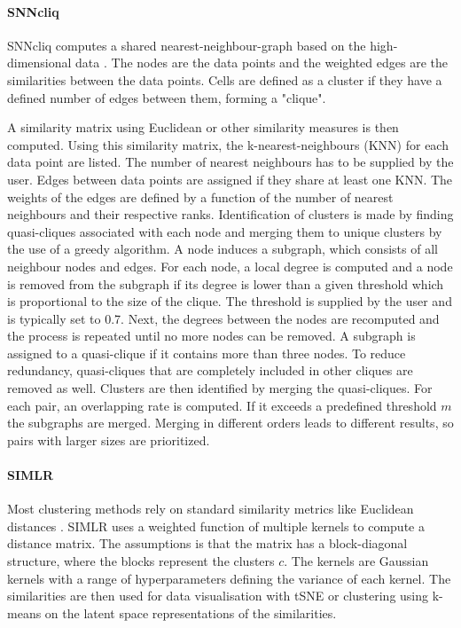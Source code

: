 \documentclass[12pt, a4paper]{article}\usepackage[]{graphicx}\usepackage[]{color}
\begin{document}
\paragraph{SNNcliq}
SNNcliq computes a shared nearest-neighbour-graph based on the high-dimensional data \citep{xu2015identification}. The nodes are the data points and the weighted edges are the similarities between the data points. Cells are defined as a cluster if they have a defined number of edges between them, forming a "clique". 

A similarity matrix using Euclidean or other similarity measures is then computed. Using this similarity matrix, the k-nearest-neighbours (KNN) for each data point are listed. The number of nearest neighbours has to be supplied by the user. Edges between data points are assigned if they share at least one KNN. The weights of the edges are defined by a function of the number of nearest neighbours and their respective ranks. 
Identification of clusters is made by finding quasi-cliques associated with each node and merging them to unique clusters by the use of a greedy algorithm. A node induces a subgraph, which consists of all neighbour nodes and edges. For each node, a local degree is computed and a node is removed from the subgraph if its degree is lower than a given threshold which is proportional to the size of the clique. The threshold is supplied by the user and is typically set to 0.7. Next, the degrees between the nodes are recomputed and the process is repeated until no more nodes can be removed. A subgraph is assigned to a quasi-clique if it contains more than three nodes. To reduce redundancy, quasi-cliques that are completely included in other cliques are removed as well.
Clusters are then identified by merging the quasi-cliques. For each pair, an overlapping rate is computed. If it exceeds a predefined threshold $m$ the subgraphs are merged. Merging in different orders leads to different results, so pairs with larger sizes are prioritized.
\paragraph{SIMLR}
Most clustering methods rely on standard similarity metrics like Euclidean distances \citep{wang2017visualization}. SIMLR uses a weighted function of multiple kernels to compute a distance matrix. The assumptions is that the matrix has a block-diagonal structure, where the blocks represent the clusters $c$. The kernels are Gaussian kernels with a range of hyperparameters defining the variance of each kernel. The similarities are then used for data visualisation with tSNE or clustering using k-means on the latent space representations of the similarities.
\end{document}
